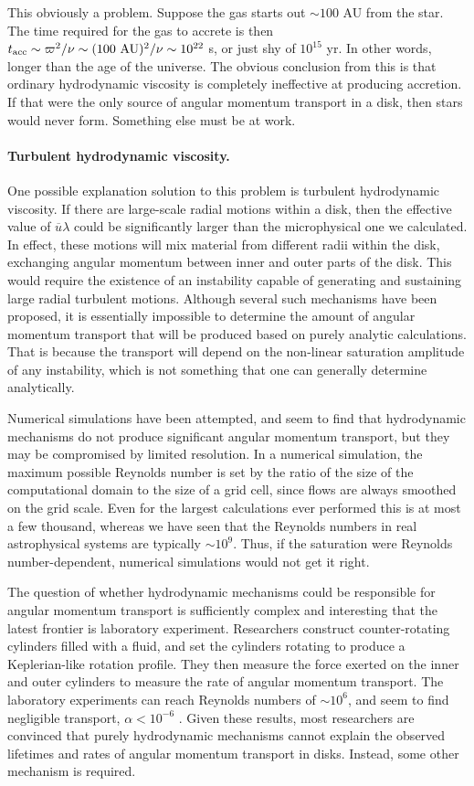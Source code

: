 This obviously a problem. Suppose the gas starts out $\sim 100$ AU from the star. The time required for the gas to accrete is then $t_{\rm acc}\sim \varpi^2/\nu \sim (100\mbox{ AU})^2/\nu \sim 10^{22}$ s, or just shy of $10^{15}$ yr. In other words, longer than the age of the universe. The obvious conclusion from this is that ordinary hydrodynamic viscosity is completely ineffective at producing accretion. If that were the only source of angular momentum transport in a disk, then stars would never form. Something else must be at work.

\paragraph{Turbulent hydrodynamic viscosity.}

One possible explanation solution to this problem is turbulent hydrodynamic viscosity. If there are large-scale radial motions within a disk, then the effective value of $\overline{u}\lambda$ could be significantly larger than the microphysical one we calculated. In effect, these motions will mix material from different radii within the disk, exchanging angular momentum between inner and outer parts of the disk. This would require the existence of an instability capable of generating and sustaining large radial turbulent motions. Although several such mechanisms have been proposed, it is essentially impossible to determine the amount of angular momentum transport that will be produced based on purely analytic calculations. That is because the transport will depend on the non-linear saturation amplitude of any instability, which is not something that one can generally determine analytically.

Numerical simulations have been attempted, and seem to find that hydrodynamic mechanisms do not produce significant angular momentum transport, but they may be compromised by limited resolution. In a numerical simulation, the maximum possible Reynolds number is set by the ratio of the size of the computational domain to the size of a grid cell, since flows are always smoothed on the grid scale. Even for the largest calculations ever performed this is at most a few thousand, whereas we have seen that the Reynolds numbers in real astrophysical systems are typically $\sim 10^9$. Thus, if the saturation were Reynolds number-dependent, numerical simulations would not get it right.

The question of whether hydrodynamic mechanisms could be responsible for angular momentum transport is sufficiently complex and interesting that the latest frontier is laboratory experiment. Researchers construct counter-rotating cylinders filled with a fluid, and set the cylinders rotating to produce a Keplerian-like rotation profile. They then measure the force exerted on the inner and outer cylinders to measure the rate of angular momentum transport. The laboratory experiments can reach Reynolds numbers of $\sim 10^6$, and seem to find negligible transport, $\alpha < 10^{-6}$ \citep{ji06a}. Given these results, most researchers are convinced that purely hydrodynamic mechanisms cannot explain the observed lifetimes and rates of angular momentum transport in disks. Instead, some other mechanism is required.

